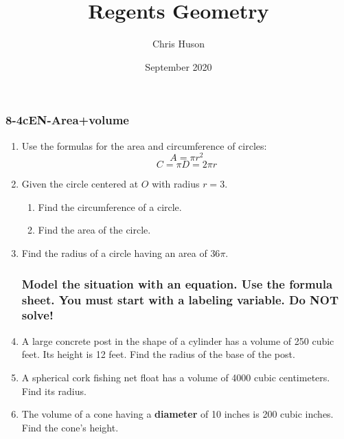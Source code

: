 \documentclass[12pt, twoside]{article}
\title{Regents Geometry}
\author{Chris Huson}
\date{September 2020}
\begin{document}
\subsubsection*{8-4cEN-Area+volume}
\begin{enumerate}
\item Use the formulas for the area and circumference of circles:
\[A=\pi r^2\]
\[C=\pi D = 2\pi r\]

\item Given the circle centered at $O$ with radius $r=3$.
  \begin{multicols}{2}
    \begin{enumerate}
      \item Find the circumference of a circle. %
      \item Find the area of the circle.\vspace{2cm}
    \end{enumerate}
  \end{multicols}

\item Find the radius of a circle having an area of $36 \pi$. \vspace{2cm}

\subsubsection*{Model the situation with an equation. Use the formula sheet. You must start with a labeling variable. \hfill Do NOT solve!}

\item A large concrete post in the shape of a cylinder has a volume of 250 cubic feet. Its height is 12 feet. Find the radius of the base of the post. \vspace{2cm}

\item A spherical cork fishing net float has a volume of 4000 cubic centimeters. Find its radius. \vspace{2cm}

\item The volume of a cone having a \textbf{diameter} of 10 inches is 200 cubic inches. Find the cone's height. \vspace{2cm}


\end{enumerate}
\end{document}
